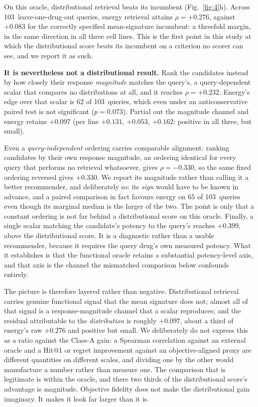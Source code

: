 \documentclass[11pt,letterpaper]{article}
\newcommand{\NCQUERIES}{103}
\newcommand{\ENERGYFUNC}{+0.276}
\newcommand{\MEANCTRLFUNC}{+0.083}
\newcommand{\MAGMATCHFUNC}{+0.232}
\newcommand{\MAGONLYFUNC}{+0.330}
\newcommand{\POTMATCHFUNC}{+0.399}
\newcommand{\ENERGYPARTIAL}{+0.097}
\newcommand{\ENERGYWINS}{62}
\newcommand{\ENERGYWINSP}{0.073}
\begin{document}
On this oracle, distributional retrieval beats its incumbent (Fig.~\ref{fig:4}h). Across
\NCQUERIES\ leave-one-drug-out queries, energy retrieval attains $\rho = \ENERGYFUNC$, against
$\MEANCTRLFUNC$ for the correctly specified mean-signature incumbent: a threefold margin, in the
same direction in all three cell lines. This is the first point in this study at which the
distributional score beats its incumbent on a criterion no scorer can see, and we report it as
such.

\textbf{It is nevertheless not a distributional result.} Rank the candidates instead by how
closely their response \emph{magnitude} matches the query's, a query-dependent scalar that
compares no distributions at all, and it reaches $\rho = \MAGMATCHFUNC$. Energy's edge over that
scalar is $\ENERGYWINS$ of \NCQUERIES\ queries, which even under an anticonservative paired test
is not significant ($p = \ENERGYWINSP$). Partial out the magnitude channel and energy retains
$\ENERGYPARTIAL$ (per line $+0.131$, $+0.053$, $+0.162$: positive in all three, but small).

Even a
\emph{query-independent} ordering carries comparable alignment: ranking candidates by their own
response magnitude, an ordering identical for every query that performs no retrieval whatsoever,
gives $\rho = -0.330$, so the same fixed ordering reversed gives $\MAGONLYFUNC$. We report its
magnitude rather than calling it a better recommender, and deliberately so: its \emph{sign} would
have to be known in advance, and a paired comparison in fact favours energy on 65 of \NCQUERIES\
queries even though its marginal median is the larger of the two. The point is only that a
constant ordering is not far behind a distributional score on this oracle. Finally, a single
scalar matching the candidate's potency to the query's reaches $\POTMATCHFUNC$, above the
distributional score. It is a diagnostic rather than a usable recommender, because it requires the
query drug's own measured potency. What it establishes is that the functional oracle retains a
substantial potency-level axis, and that axis is the channel the mismatched comparison below
confounds entirely.

The picture is therefore layered rather than negative. Distributional retrieval carries genuine
functional signal that the mean signature does not; almost all of that signal is a
response-magnitude channel that a scalar reproduces; and the residual attributable to the
\emph{distribution} is roughly $\ENERGYPARTIAL$, about a third of energy's raw $\ENERGYFUNC$ and
positive but small. We deliberately do not express this as a ratio against the Class-A gain: a
Spearman correlation against an external oracle and a Hit@1 or regret improvement against an
objective-aligned proxy are different quantities on different scales, and dividing one by the
other would manufacture a number rather than measure one. The comparison that is legitimate is
within the oracle, and there two thirds of the distributional score's advantage is magnitude.
Objective fidelity does not make the distributional gain imaginary. It makes it look far larger
than it is.
\end{document}
